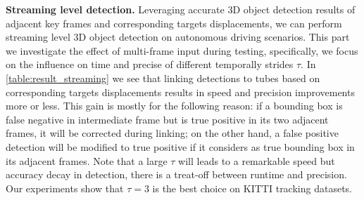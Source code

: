 \documentclass{bmvc2k}
\begin{document}
\textbf{Streaming level detection.} Leveraging accurate 3D object detection results of adjacent key frames and corresponding targets displacements, we can perform streaming level 3D object detection on autonomous driving scenarios. This part we investigate the effect of multi-frame input during testing, specifically, we focus on the influence on time and precise of different temporally strides $\tau$. In \tablename \, \ref{table:result_streaming} we see that linking detections to tubes based on corresponding targets displacements results in speed and precision improvements more or less. This gain is mostly for the following reason: if a bounding box is false negative in intermediate frame but is true positive in its two adjacent frames, it will be corrected during linking; on the other hand, a false positive detection will be modified to true positive if it considers as true bounding box in its adjacent frames. Note that a large $\tau$ will leads to a remarkable speed but accuracy decay in detection, there is a treat-off between runtime and precision. Our experiments show that $\tau = 3$ is the best choice on KITTI tracking datasets.
\end{document}
